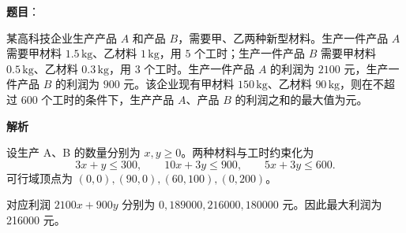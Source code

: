 \begin{answer}

\textbf{题目}：

某高科技企业生产产品 $A$ 和产品 $B$，需要甲、乙两种新型材料。生产一件产品 $A$ 需要甲材料 $1.5\,\mathrm{kg}$、乙材料 $1\,\mathrm{kg}$，用 $5$ 个工时；生产一件产品 $B$ 需要甲材料 $0.5\,\mathrm{kg}$、乙材料 $0.3\,\mathrm{kg}$，用 $3$ 个工时。生产一件产品 $A$ 的利润为 $2100$ 元，生产一件产品 $B$ 的利润为 $900$ 元。该企业现有甲材料 $150\,\mathrm{kg}$、乙材料 $90\,\mathrm{kg}$，则在不超过 $600$ 个工时的条件下，生产产品 $A$、产品 $B$ 的利润之和的最大值为\gkblank{}元。

\textbf{解析}

设生产 A、B 的数量分别为 \(x,y\ge0\)。两种材料与工时约束化为
\nopagebreak[4]
\[
3x+y\le300,\qquad10x+3y\le900,\qquad5x+3y\le600.
\]
可行域顶点为 \((0,0),(90,0),(60,100),(0,200)\)。

对应利润 \(2100x+900y\) 分别为 \(0,189000,216000,180000\) 元。因此最大利润为 216000 元。


\end{answer}

